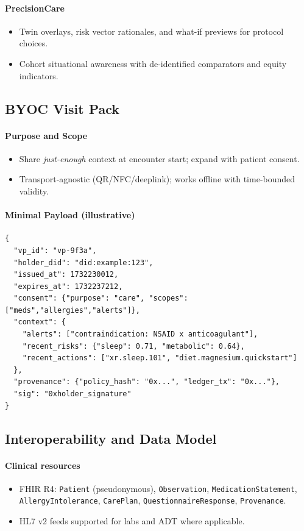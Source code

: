 \documentclass[11pt]{article}
\theoremstyle{plain}
\begin{document}
\paragraph{PrecisionCare}
\begin{itemize}
  \item Twin overlays, risk vector rationales, and what-if previews for protocol choices.
  \item Cohort situational awareness with de-identified comparators and equity indicators.
\end{itemize}

\subsection{BYOC Visit Pack}
\paragraph{Purpose and Scope}
\begin{itemize}
  \item Share \emph{just-enough} context at encounter start; expand with patient consent.
  \item Transport-agnostic (QR/NFC/deeplink); works offline with time-bounded validity.
\end{itemize}

\paragraph{Minimal Payload (illustrative)}
\begin{verbatim}
{
  "vp_id": "vp-9f3a",
  "holder_did": "did:example:123",
  "issued_at": 1732230012,
  "expires_at": 1732237212,
  "consent": {"purpose": "care", "scopes": ["meds","allergies","alerts"]},
  "context": {
    "alerts": ["contraindication: NSAID x anticoagulant"],
    "recent_risks": {"sleep": 0.71, "metabolic": 0.64},
    "recent_actions": ["xr.sleep.101", "diet.magnesium.quickstart"]
  },
  "provenance": {"policy_hash": "0x...", "ledger_tx": "0x..."},
  "sig": "0xholder_signature"
}
\end{verbatim}

\subsection{Interoperability and Data Model}
\paragraph{Clinical resources}
\begin{itemize}
  \item FHIR R4: \texttt{Patient} (pseudonymous), \texttt{Observation}, \texttt{MedicationStatement}, 
        \texttt{AllergyIntolerance}, \texttt{CarePlan}, \texttt{QuestionnaireResponse}, \texttt{Provenance}.
  \item HL7 v2 feeds supported for labs and ADT where applicable.
\end{itemize}
\end{document}

